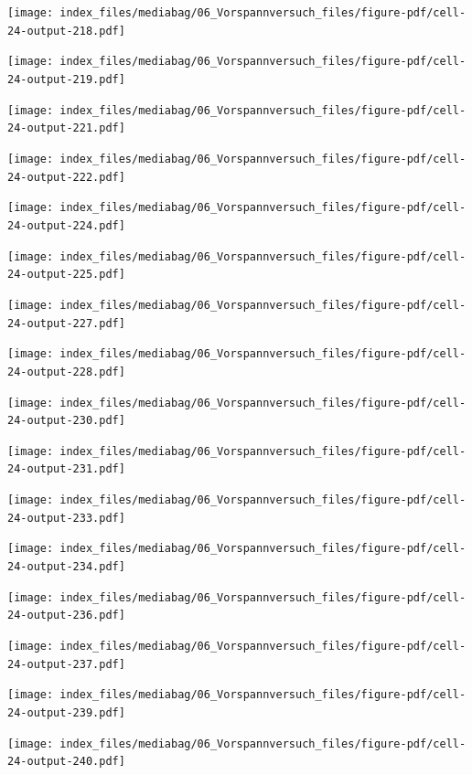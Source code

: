 \documentclass[
  11pt,
  letterpaper,
]{scrreprt}
\begin{document}
\newpage{}

\texttt{[image: index\_files/mediabag/06\_Vorspannversuch\_files/figure-pdf/cell-24-output-218.pdf]}

\texttt{[image: index\_files/mediabag/06\_Vorspannversuch\_files/figure-pdf/cell-24-output-219.pdf]}

\newpage{}

\texttt{[image: index\_files/mediabag/06\_Vorspannversuch\_files/figure-pdf/cell-24-output-221.pdf]}

\texttt{[image: index\_files/mediabag/06\_Vorspannversuch\_files/figure-pdf/cell-24-output-222.pdf]}

\newpage{}

\texttt{[image: index\_files/mediabag/06\_Vorspannversuch\_files/figure-pdf/cell-24-output-224.pdf]}

\texttt{[image: index\_files/mediabag/06\_Vorspannversuch\_files/figure-pdf/cell-24-output-225.pdf]}

\newpage{}

\texttt{[image: index\_files/mediabag/06\_Vorspannversuch\_files/figure-pdf/cell-24-output-227.pdf]}

\texttt{[image: index\_files/mediabag/06\_Vorspannversuch\_files/figure-pdf/cell-24-output-228.pdf]}

\newpage{}

\texttt{[image: index\_files/mediabag/06\_Vorspannversuch\_files/figure-pdf/cell-24-output-230.pdf]}

\texttt{[image: index\_files/mediabag/06\_Vorspannversuch\_files/figure-pdf/cell-24-output-231.pdf]}

\newpage{}

\texttt{[image: index\_files/mediabag/06\_Vorspannversuch\_files/figure-pdf/cell-24-output-233.pdf]}

\texttt{[image: index\_files/mediabag/06\_Vorspannversuch\_files/figure-pdf/cell-24-output-234.pdf]}

\newpage{}

\texttt{[image: index\_files/mediabag/06\_Vorspannversuch\_files/figure-pdf/cell-24-output-236.pdf]}

\texttt{[image: index\_files/mediabag/06\_Vorspannversuch\_files/figure-pdf/cell-24-output-237.pdf]}

\newpage{}

\texttt{[image: index\_files/mediabag/06\_Vorspannversuch\_files/figure-pdf/cell-24-output-239.pdf]}

\texttt{[image: index\_files/mediabag/06\_Vorspannversuch\_files/figure-pdf/cell-24-output-240.pdf]}
\end{document}
